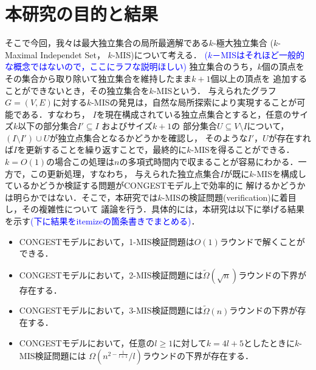 \documentclass[12pt]{thesis}
\newcommand{\Izumi}[1]{\textcolor{blue}{(#1)}}
\newcommand{\CONGEST}{\textsf{CONGEST}}
\theoremstyle{definition}
\begin{document}
\section{本研究の目的と結果}
そこで今回，我々は最大独立集合の局所最適解である$k$-極大独立集合
($k$-Maximal Independet Set， $k$-MIS)について考える．
\Izumi{$k$－MISはそれほど一般的な概念ではないので，ここにラフな説明ほしい}
独立集合のうち，$k$個の頂点をその集合から取り除いて独立集合を維持したまま$k + 1$個以上の頂点を
追加することができないとき，その独立集合を$k$-MISという．
与えられたグラフ$G=(V, E)$に対する$k$-MISの発見は，自然な局所探索により実現することが可能である．すなわち，
$I$を現在構成されている独立点集合とすると，任意のサイズ$k$以下の部分集合$I' \subseteq I$ およびサイズ$k + 1$の
部分集合$U \subseteq V\setminus I$について，$(I \setminus I') \cup U$が独立点集合となるかどうかを確認し，
そのような$I'$，$U$が存在すれば$I$を更新することを繰り返すことで，最終的に$k$-MISを得ることができる．
$k = O(1)$の場合この処理は$n$の多項式時間内で収まることが容易にわかる．一方で，この更新処理，すなわち，
与えられた独立点集合$I$が既に$k$-MISを構成しているかどうか検証する問題が{\CONGEST}モデル上で効率的に
解けるかどうかは明らかではない．そこで，本研究では$k$-MISの検証問題(verification)に着目し，その複雑性について
議論を行う．具体的には，本研究は以下に挙げる結果を示す\Izumi{下に結果をitemizeの箇条書きでまとめる}．
\begin{itemize}
\item {\CONGEST}モデルにおいて，1-MIS検証問題は$O(1)$ラウンドで解くことができる．
\item {\CONGEST}モデルにおいて，2-MIS検証問題には$\tilde{\Omega} (\sqrt{n})$ラウンドの下界が存在する．
\item {\CONGEST}モデルにおいて，3-MIS検証問題には$\tilde{\Omega} (n)$ラウンドの下界が存在する．
\item {\CONGEST}モデルにおいて，任意の$l \geq 1$に対して$k = 4l + 5$としたときに$k$-MIS検証問題には
$\Omega\left(n^{2 - \frac{1}{l+1}}/l\right)$ラウンドの下界が存在する．
\end{itemize}
\end{document}
